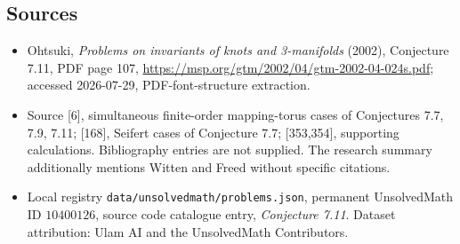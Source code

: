 \documentclass[11pt]{article}
\begin{document}
\subsection{Sources}
\begin{itemize}
\item Ohtsuki, \emph{Problems on invariants of knots and 3-manifolds} (2002), Conjecture 7.11, PDF page 107, \url{https://msp.org/gtm/2002/04/gtm-2002-04-024s.pdf}; accessed 2026-07-29, PDF-font-structure extraction.
\item Source [6], simultaneous finite-order mapping-torus cases of Conjectures 7.7, 7.9, 7.11; [168], Seifert cases of Conjecture 7.7; [353,354], supporting calculations. Bibliography entries are not supplied. The research summary additionally mentions Witten and Freed without specific citations.
\item Local registry \texttt{data/unsolvedmath/problems.json}, permanent UnsolvedMath ID $10400126$, source code catalogue entry, \emph{Conjecture 7.11}. Dataset attribution: Ulam AI and the UnsolvedMath Contributors.
\end{itemize}
\end{document}
